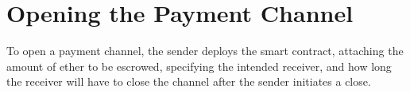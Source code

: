 \section{Opening the Payment Channel}\label{sec:opening-the-payment-channel}
To open a payment channel, the sender deploys the smart contract, attaching the amount of ether to be escrowed,
specifying the intended receiver, and how long the receiver will have to close the channel after the sender initiates a
close.
